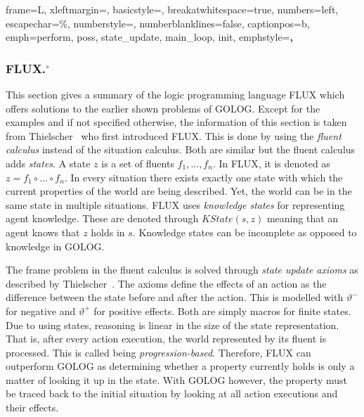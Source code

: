 { %
  frame=L,
  xleftmargin=\parindent,
  basicstyle=\footnotesize\ttfamily,
  breakatwhitespace=true,
  numbers=left,
  escapechar=\%,
  numberstyle=\tiny,
  numberblanklines=false,
  captionpos=b,
  emph={perform, poss, state\_update, main\_loop, init},
  emphstyle=\textbf,
}
%
\lstset{style=flux} %
\subsubsection[FLUX.]{FLUX.$^\circ$}\label{fun:apl_flux}
This section gives a summary of the logic programming language FLUX which offers solutions to the earlier shown problems of GOLOG. Except for the examples and if not specified otherwise, the information of this section is taken from Thielscher~\cite{thielscher_flux:_2005} who first introduced FLUX. This is done by using the \emph{fluent calculus} instead of the situation calculus. Both are similar but the fluent calculus adds \emph{states}. A state $z$ is a set of fluents $f_1,\dotsc,f_n$. In FLUX, it is denoted as $z = f_1 \circ\dotsc\circ f_n$. In every situation there exists exactly one state with which the current properties of the world are being described. Yet, the world can be in the same state in multiple situations. FLUX uses \emph{knowledge states} for representing agent knowledge. These are denoted through $\textit{KState}(s,z)$ meaning that an agent knows that $z$ holds in $s$. Knowledge states can be incomplete as opposed to knowledge in GOLOG.

The frame problem in the fluent calculus is solved through \emph{state update axioms} as described by Thielscher~\cite{thielscher_situation_1999}. The axioms define the effects of an action as the difference between the state before and after the action. This is modelled with $\vartheta^-$ for negative and $\vartheta^+$ for positive effects. Both are simply macros for finite states. Due to using states, reasoning is linear in the size of the state representation. That is, after every action execution, the world represented by its fluent is processed. This is called being \emph{progression-based}. Therefore, FLUX can outperform GOLOG as determining whether a property currently holds is only a matter of looking it up in the state. With GOLOG however, the property must be traced back to the initial situation by looking at all action executions and their effects.

